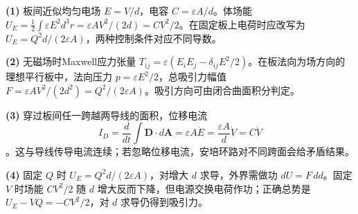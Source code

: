 \par\noindent\textbf{(1)} 板间近似均匀电场 \(E=V/d\)，电容 \(C=\varepsilon A/d\)。体场能 \(U_E=\frac12\int\varepsilon E^2d^3r=\varepsilon AV^2/(2d)=CV^2/2\)。在固定板上电荷时应改写为 \(U_E=Q^2d/(2\varepsilon A)\)，两种控制条件对应不同导数。
\par\noindent\textbf{(2)} 无磁场时Maxwell应力张量 \(T_{ij}=\varepsilon(E_iE_j-\delta_{ij}E^2/2)\)。在板法向为场方向的理想平行板中，法向压力 \(p=\varepsilon E^2/2\)，总吸引力幅值 \(F=\varepsilon AV^2/(2d^2)=Q^2/(2\varepsilon A)\)。吸引方向可由闭合曲面积分判定。
\par\noindent\textbf{(3)} 穿过板间任一跨越两导线的面积，位移电流 \[I_D=\frac{d}{dt}\int\boldsymbol D\cdot d\boldsymbol A=\varepsilon A\dot E=\frac{\varepsilon A}{d}\dot V=C\dot V\]。这与导线传导电流连续；若忽略位移电流，安培环路对不同跨面会给矛盾结果。
\par\noindent\textbf{(4)} 固定 \(Q\) 时 \(U_E=Q^2d/(2\varepsilon A)\)，对增大 \(d\) 求导，外界需做功 \(dU=F\,dd\)。固定 \(V\) 时场能 \(CV^2/2\) 随 \(d\) 增大反而下降，但电源交换电荷作功；正确总势是 \(U_E-VQ=-CV^2/2\)，对 \(d\) 求导仍得到吸引力。
